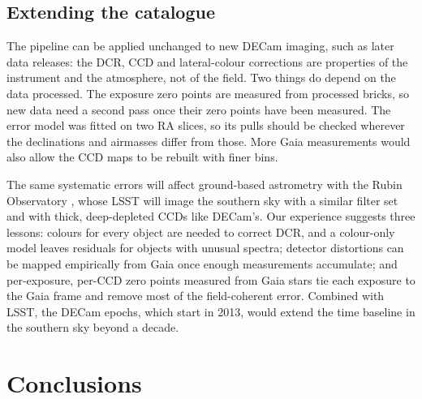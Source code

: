 \documentclass[usenatbib]{mnras}   %
\begin{document}
\subsection{Extending the catalogue}

The pipeline can be applied unchanged to new DECam imaging, such as later data releases: the DCR, CCD and lateral-colour corrections are properties of the instrument and the atmosphere, not of the field. Two things do depend on the data processed. The exposure zero points are measured from processed bricks, so new data need a second pass once their zero points have been measured. The error model was fitted on two RA slices, so its pulls should be checked wherever the declinations and airmasses differ from those. More Gaia measurements would also allow the CCD maps to be rebuilt with finer bins.

The same systematic errors will affect ground-based astrometry with the Rubin Observatory \citep{Rubin2019}, whose LSST will image the southern sky with a similar filter set and with thick, deep-depleted CCDs like DECam's. Our experience suggests three lessons: colours for every object are needed to correct DCR, and a colour-only model leaves residuals for objects with unusual spectra; detector distortions can be mapped empirically from Gaia once enough measurements accumulate; and per-exposure, per-CCD zero points measured from Gaia stars tie each exposure to the Gaia frame and remove most of the field-coherent error. Combined with LSST, the DECam epochs, which start in 2013, would extend the time baseline in the southern sky beyond a decade.

\section{Conclusions} \label{sec:conclusions}
\end{document}
